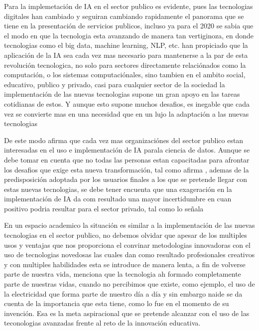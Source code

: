 Para \citet{publicservices} la implemetación de IA en el sector publico es evidente, pues las tecnologias digitales han cambiado y seguiran cambiando rapidamente el panorama que se tiene en la presentación de servicios publicos, incluso ya para el 2020 se sabia que el modo en que la tecnologia esta avanzando de manera tan vertiginoza, en donde tecnologias como el big data, machine learning, NLP, etc. han propiciado que la aplicación de la IA sea cada vez mas necesario para mantenerse a la par de esta revolución tecnologica, no solo para sectores directamente relaciónados como la computación, o los sistemas computaciónales, sino tambien en el ambito social, educativo, publico y privado, casi para cualquier sector de la sociedad la implementación de las nuevas tecnologias supone un gran apoyo en las tareas cotidianas de estos. Y aunque esto supone muchos desafios, es inegable que cada vez se convierte mas en una necesidad que en un lujo la adaptación a las nuevas tecnologias\citep{publico}

De este modo \citet{aiftps} afirma que cada vez mas organizaciónes del sector publico estan interesadas en el uso e implementación de IA parala ciencia de datos. Aunque se debe tomar en cuenta que no todas las personas estan capacitadas para afrontar los desafios que exige esta nueva transformación, tal como afirma \citet{agarwal2018public}, ademas de la predisposición adoptada por los usuarios finales a los que se pretende llegar con estas nuevas tecnologias, se debe tener encuenta que una exageración en la implementación de IA da com resultado una mayor incertidumbre en cuan positivo podria resultar para el sector privado, tal como lo señala \citet{sun2019mapping}

En un espacio academico la situación es similar a la implementación de las nuevas tecnologias en el sector publico, no debemos olvidar que apesar de los multiples usos y ventajas que nos proporciona el convinar metodologias innovadoras con el uso de tecnologias novedosas las cuales dan como resultado profesionales creativos y con multiples habilidades \citep{renz2020prerequisites} esta se introduce de manera lenta, a fin de volverse parte de nuestra vida, \citet{331464460002} menciona que la tecnologia ah formado completamente parte de nuestras vidas, cuando no percibimos que existe, como ejemplo, el uso de la electricidad que forma parte de nuestro día a día y sin embargo naide se da cuenta de la importancia que esta tiene, como lo fue en el momento de su invención. Esa es la meta aspiracional que se pretende alcanzar con el uso de las teconologias avanzadas frente al reto de la innovación educativa.

